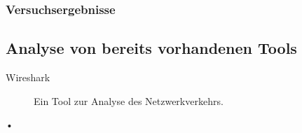 	\subsubsection{Versuchsergebnisse}
	
	\subsection{Analyse von bereits vorhandenen Tools} %
	\begin{description}
		\item[Wireshark] Ein Tool zur Analyse des Netzwerkverkehrs.
		\item[•]
	\end{description}